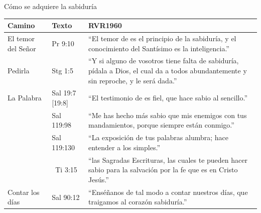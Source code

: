 \begin{frame}{Cómo se adquiere la sabiduría}
\scriptsize\renewcommand{\arraystretch}{1.18}
\begin{tabular}{@{}>{\RaggedRight\arraybackslash}p{2.4cm}>{\RaggedRight\arraybackslash}p{1.9cm}>{\RaggedRight\arraybackslash}p{7.5cm}@{}}
\toprule
\textbf{Camino} & \textbf{Texto} & \textbf{RVR1960} \\ \midrule
El temor del Señor & Pr 9:10 & ``El temor de \SENOR{} es el principio de la sabiduría, y el conocimiento del Santísimo es la inteligencia.'' \\
Pedirla & Stg 1:5 & ``Y si alguno de vosotros tiene falta de sabiduría, pídala a Dios, el cual da a todos abundantemente y sin reproche, y le será dada.'' \\
La Palabra & Sal 19:7 [19:8] & ``El testimonio de \SENOR{} es fiel, que hace sabio al sencillo.'' \\
 & Sal 119:98 & ``Me has hecho más sabio que mis enemigos con tus mandamientos, porque siempre están conmigo.'' \\
 & Sal 119:130 & ``La exposición de tus palabras alumbra; hace entender a los simples.'' \\
 & 2~Ti 3:15 & ``las Sagradas Escrituras, las cuales te pueden hacer sabio para la salvación por la fe que es en Cristo Jesús.'' \\
Contar los días & Sal 90:12 & ``Enséñanos de tal modo a contar nuestros días, que traigamos al corazón sabiduría.'' \\
\bottomrule
\end{tabular}\par\smallskip
{}
\end{frame}

